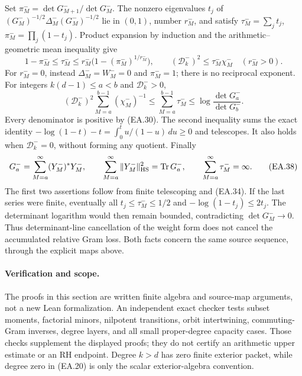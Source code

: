 Set \(\pi_M^- =\det G_{M+1}^-/\det G_M^-\).
The nonzero eigenvalues \(t_j\) of
\((G_M^-)^{-1/2}\Delta_M^-(G_M^-)^{-1/2}\) lie in \((0,1)\),
number \(r_M^-\), and satisfy
\(\tau_M^-=\sum_jt_j\), \(\pi_M^-=\prod_j(1-t_j)\).
Product expansion by induction and the arithmetic--geometric mean
inequality give
\[
 1-\pi_M^-\le\tau_M^-\le
 r_M^-\bigl(1-(\pi_M^-)^{1/r_M^-}\bigr),\qquad
 (\mathcal D_k^-)^2\le\tau_M^-\chi_M^-
 \quad(r_M^->0).
 \tag{EA.36}
\]
For \(r_M^-=0\), instead \(\Delta_M^-=W_M^-=0\) and
\(\pi_M^-=1\); there is no reciprocal exponent.  For integers
\(k(d-1)\le a<b\) and \(\mathcal D_k^->0\),
\[
 (\mathcal D_k^-)^2\sum_{M=a}^{b-1}(\chi_M^-)^{-1}
 \le\sum_{M=a}^{b-1}\tau_M^-
 \le\log\frac{\det G_a^-}{\det G_b^-}.
 \tag{EA.37}
\]
Every denominator is positive by (EA.30).  The second inequality
sums the exact identity
\(-\log(1-t)-t=\int_0^t u/(1-u)\,du\ge0\) and telescopes.
It also holds when \(\mathcal D_k^-=0\), without forming any
quotient.  Finally
\[
 G_a^-=\sum_{M=a}^{\infty}(Y_M^-)^*Y_M^-,\qquad
 \sum_{M=a}^{\infty}\|Y_M^-\|_{\rm HS}^2=\operatorname{Tr}G_a^-,
 \qquad \sum_{M=a}^{\infty}\tau_M^-=\infty.
 \tag{EA.38}
\]
The first two assertions follow from finite telescoping and (EA.34).
If the last series were finite, eventually all \(t_j\le\tau_M^-\le1/2\)
and \(-\log(1-t_j)\le2t_j\).  The determinant logarithm
would then remain bounded, contradicting \(\det G_M^-\to0\).
Thus determinant-line cancellation of the weight form does not cancel
the accumulated relative Gram loss.  Both facts concern the same
source sequence, through the explicit maps above.

\paragraph{Verification and scope.}
The proofs in this section are written finite algebra and source-map
arguments, not a new Lean formalization.  An independent exact checker
tests subset moments, factorial minors, nilpotent transitions, orbit
intertwining, commuting-Gram inverses, degree layers, and all small
proper-degree capacity cases.  Those checks supplement the displayed
proofs; they do not certify an arithmetic upper estimate or an RH
endpoint.  Degree \(k>d\) has zero finite exterior packet, while
degree zero in (EA.20) is only the scalar exterior-algebra convention.
